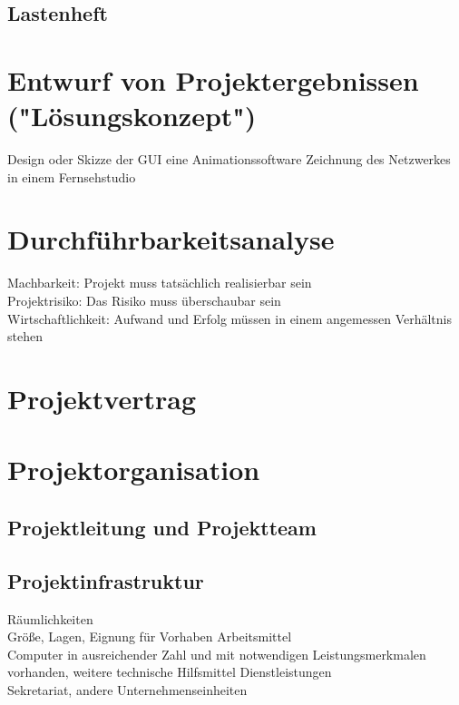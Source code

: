 \documentclass[a4paper, 12pt]{article}
\begin{document}
\subsection{Lastenheft}
\section{Entwurf von Projektergebnissen ("Lösungskonzept") }
Design oder Skizze der GUI eine Animationssoftware
Zeichnung des Netzwerkes in einem Fernsehstudio 
\section{Durchführbarkeitsanalyse}
Machbarkeit: Projekt muss tatsächlich realisierbar sein 
\\
Projektrisiko: Das Risiko muss überschaubar sein 
\\
Wirtschaftlichkeit: Aufwand und Erfolg müssen in einem angemessen Verhältnis stehen 
\section{Projektvertrag}
\section{Projektorganisation}
\subsection{Projektleitung und Projektteam}
\subsection{Projektinfrastruktur}
Räumlichkeiten
\\
Größe, Lagen, Eignung für Vorhaben 
Arbeitsmittel
\\
Computer in ausreichender Zahl und mit notwendigen 
Leistungsmerkmalen vorhanden, weitere technische Hilfsmittel
Dienstleistungen
\\
Sekretariat, andere Unternehmenseinheiten
\end{document}
